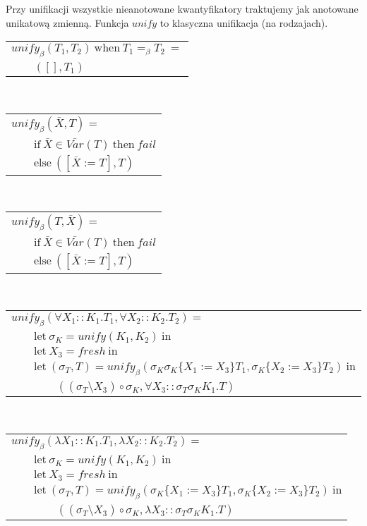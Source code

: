 \documentclass[11pt,leqno]{article}
\begin{document}
Przy unifikacji wszystkie nieanotowane kwantyfikatory traktujemy jak anotowane unikatową zmienną.
Funkcja $unify$ to klasyczna unifikacja (na rodzajach).\\
\begin{tabular}{l}
$unify_\beta(T_1, T_2) \ \textrm{when} \ T_1 =_\beta T_2 \ = $ \\
$\qquad ([], T_1)$ \\
\end{tabular} \\
\begin{tabular}{l}
$unify_\beta(\bar{X}, T) = $ \\
$\qquad \textrm{if} \ \bar{X} \in \bar{Var}(T) \ \textrm{then} \ fail $ \\
$\qquad \textrm{else} \ ([\bar{X} := T], T) $ \\
\end{tabular} \\
\begin{tabular}{l}
$unify_\beta(T, \bar{X}) = $ \\
$\qquad \textrm{if} \ \bar{X} \in \bar{Var}(T) \ \textrm{then} \ fail $ \\
$\qquad \textrm{else} \ ([\bar{X} := T], T) $ \\
\end{tabular} \\
\begin{tabular}{l}
$unify_\beta(\forall X_1::K_1.T_1, \forall X_2::K_2.T_2) = $ \\
$\qquad \textrm{let} \ \sigma_K = unify(K_1, K_2) \ \textrm{in} $ \\
$\qquad \textrm{let} \ X_3 = fresh \ \textrm{in} $ \\
$\qquad \textrm{let} \ (\sigma_T, T) = unify_\beta(\sigma_K \sigma_K \{X_1 := X_3\}T_1, \sigma_K \{X_2 := X_3\}T_2) \ \textrm{in} $ \\
$\qquad\qquad ((\sigma_T \setminus X_3) \circ \sigma_K, \forall X_3::\sigma_T \sigma_K K_1.T) $ \\
\end{tabular} \\
\begin{tabular}{l}
$unify_\beta(\lambda X_1::K_1.T_1, \lambda X_2::K_2.T_2) = $ \\
$\qquad \textrm{let} \ \sigma_K = unify(K_1, K_2) \ \textrm{in} $ \\
$\qquad \textrm{let} \ X_3 = fresh \ \textrm{in} $ \\
$\qquad \textrm{let} \ (\sigma_T, T) = unify_\beta(\sigma_K \{X_1 := X_3\}T_1, \sigma_K \{X_2 := X_3\}T_2) \ \textrm{in} $ \\
$\qquad\qquad ((\sigma_T \setminus X_3) \circ \sigma_K, \lambda X_3::\sigma_T \sigma_K K_1.T) $ \\
\end{tabular} \\
\end{document}

